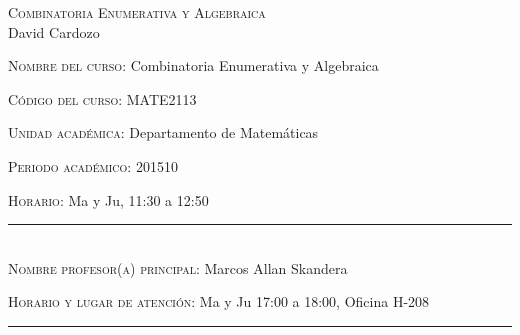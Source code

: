 \begin{center}
\textsc{\large  Combinatoria Enumerativa y Algebraica }\\[0.1cm]
\large David Cardozo\\[0.5cm]
\end{center}	

\large \noindent\textsc{Nombre del curso:}  Combinatoria Enumerativa y Algebraica %

\noindent\textsc{Código del curso:} MATE2113 %

\noindent\textsc{Unidad académica:} Departamento de Matemáticas

\noindent\textsc{Periodo acad\'emico:} 201510 %

\noindent\textsc{Horario:} Ma y Ju, 11:30 a 12:50%

\noindent\rule{\textwidth}{1pt}\\[-0.3cm]

\normalsize \noindent\textsc{Nombre profesor(a) principal:} Marcos Allan Skandera %


\noindent\textsc{Horario y lugar de atenci\'on:} Ma y Ju 17:00 a
18:00, Oficina H-208

\noindent\rule{\textwidth}{1pt}\\[-0.1cm]